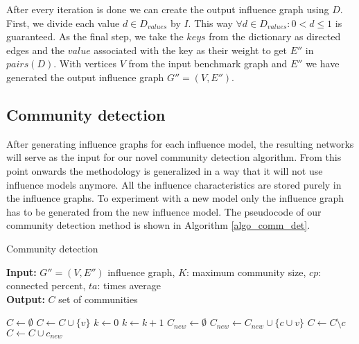 \documentclass[pdflatex,sn-mathphys-num]{sn-jnl}
\begin{document}
After every iteration is done we can create the output influence graph using $D$. First, we divide each value $d \in D_{values}$ by $I$. This way $\forall d \in D_{values}: 0 < d \leq 1$ is guaranteed. As the final step, we take the $keys$ from the dictionary as directed edges and the $value$ associated with the key as their weight to get $E''$ in $pairs(D)$. With vertices $V$ from the input benchmark graph and $E''$ we have generated the output influence graph $G''=(V,E'')$.


\subsection{Community detection}\label{subsec_commdet}

After generating influence graphs for each influence model, the resulting networks will serve as the input for our novel community detection algorithm. From this point onwards the methodology is generalized in a way that it will not use influence models anymore. All the influence characteristics are stored purely in the influence graphs. To experiment with a new model only the influence graph has to be generated from the new influence model. The pseudocode of our community detection method is shown in Algorithm \ref{algo_comm_det}.

\begin{algorithm}[ht]
\caption{Community detection}
\label{algo_comm_det}
\textbf{Input:} $G'' = (V,E'')$ influence graph, $K$: maximum community size, $cp$: connected percent, $ta$: times average
\\
\textbf{Output:} $C$ set of communities
\begin{algorithmic}[1]
    \State $C \gets \emptyset$
        \State $C \gets C \cup \{v\}$
    \EndFor
    \State $k \gets 0$
        \State $k \gets k + 1$
        \State $C_{new} \gets \emptyset$
                \State $C_{new} \gets C_{new} \cup \{c \cup v\}$
            \EndIf
        \EndFor
                \State $C \gets C \setminus c$
            \EndIf
        \EndFor
            \State $C \gets C \cup c_{new}$
        \EndFor
    \EndWhile
\end{algorithmic}
\end{algorithm}
\end{document}
